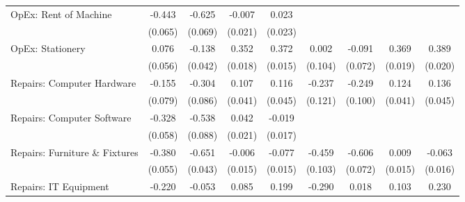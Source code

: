 {\begin{longtable}{l*{8}{c}}
OpEx: Rent of Machine&      -0.443\sym{***}&      -0.625\sym{***}&      -0.007         &       0.023         &                     &                     &                     &                     \\
                    &     (0.065)         &     (0.069)         &     (0.021)         &     (0.023)         &                     &                     &                     &                     \\
OpEx: Stationery    &       0.076         &      -0.138\sym{**} &       0.352\sym{***}&       0.372\sym{***}&       0.002         &      -0.091         &       0.369\sym{***}&       0.389\sym{***}\\
                    &     (0.056)         &     (0.042)         &     (0.018)         &     (0.015)         &     (0.104)         &     (0.072)         &     (0.019)         &     (0.020)         \\
Repairs: Computer Hardware&      -0.155\sym{*}  &      -0.304\sym{***}&       0.107\sym{**} &       0.116\sym{**} &      -0.237         &      -0.249\sym{*}  &       0.124\sym{**} &       0.136\sym{**} \\
                    &     (0.079)         &     (0.086)         &     (0.041)         &     (0.045)         &     (0.121)         &     (0.100)         &     (0.041)         &     (0.045)         \\
Repairs: Computer Software&      -0.328\sym{***}&      -0.538\sym{***}&       0.042         &      -0.019         &                     &                     &                     &                     \\
                    &     (0.058)         &     (0.088)         &     (0.021)         &     (0.017)         &                     &                     &                     &                     \\
Repairs: Furniture \& Fixtures&      -0.380\sym{***}&      -0.651\sym{***}&      -0.006         &      -0.077\sym{***}&      -0.459\sym{***}&      -0.606\sym{***}&       0.009         &      -0.063\sym{***}\\
                    &     (0.055)         &     (0.043)         &     (0.015)         &     (0.015)         &     (0.103)         &     (0.072)         &     (0.015)         &     (0.016)         \\
Repairs: IT Equipment&      -0.220         &      -0.053         &       0.085         &       0.199\sym{***}&      -0.290         &       0.018         &       0.103         &       0.230\sym{***}\\

\end{longtable}}
